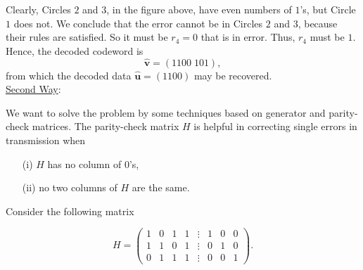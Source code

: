 \documentclass[a4 paper]{article}
\numberwithin{equation}{section}
\newcommand{\0}{\mathbf{0}}
\begin{document}
Clearly, Circles $2$ and $3$, in the figure above, have even numbers of $1$'s, but Circle $1$ does not. We conclude that the error cannot be in Circles $2$ and $3$, because their rules are satisfied. So it must be $r_4=0$ that is in error. Thus, $r_4$ must be $1$. Hence, the decoded codeword is
\begin{equation}
{\mathbf{\hat{v}}}=(1100 \; 101),
\label{equ1.1}
\end{equation}
from which the decoded data ${\mathbf{\hat{u}}}=(1100)$ may be recovered. \\

%
\underline{Second Way}:

We want to solve the problem by some techniques based on generator and parity-check matrices. The parity-check matrix $H$ is helpful in correcting single errors in transmission when
\begin{enumerate}
  \item[(i)] $H$ has no column of $0$'s,
  \item[(ii)] no two columns of $H$ are the same.
\end{enumerate}
Consider the following matrix

$$H=\left(
\begin{array}{cccccccc}
  1 & 0 & 1 & 1 & \vdots & 1 & 0 & 0 \\
  1 & 1 & 0 & 1 & \vdots & 0 & 1 & 0 \\
  0 & 1 & 1 & 1 & \vdots & 0 & 0 & 1
\end{array}\right).$$
\end{document}
